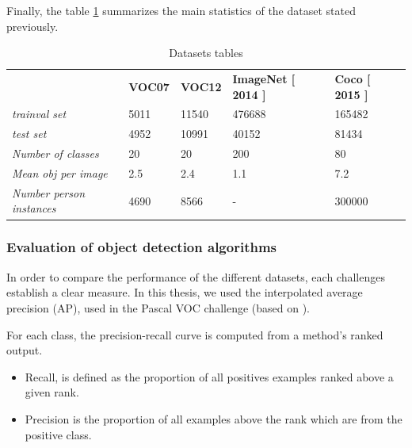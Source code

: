 \documentclass[12pt, a4paper, titlepage,twoside,openright]{article}
\begin{document}
Finally, the table \ref{dataset0} summarizes the main statistics of the dataset stated previously.

\begin{table}[H]
\centering

\begin{tabular}{lllll}
                                 & \textbf{VOC07} & \textbf{VOC12} & \textbf{ImageNet [ 2014 ]} & \textbf{Coco [ 2015 ]} \\
\textit{trainval set}            & 5011           & 11540          & 476688                     & 165482                 \\
\textit{test set}                & 4952           & 10991          & 40152                      & 81434                  \\
\textit{Number of classes}       & 20             & 20             & 200                        & 80                     \\
\textit{Mean obj per image}      & 2.5            & 2.4            & 1.1                        & 7.2                    \\
\textit{Number person instances} & 4690           & 8566           & -                          & 300000                
\end{tabular}
\caption{Datasets tables}
\label{dataset0}
\end{table}


\subsubsection{Evaluation of object detection algorithms}

In order to compare the performance of the different datasets, each challenges establish a clear measure. In this thesis, we used the interpolated average precision (AP), used in the Pascal VOC challenge (based on \cite{salton}).

For each class, the precision-recall curve is computed from a method's ranked output.

\begin{itemize}

\item Recall, is defined as the proportion of all positives examples ranked above a given rank.

\item Precision is the proportion of all examples above the rank which are from the positive class.

\end{itemize}
\end{document}
